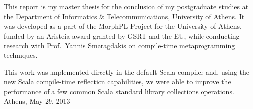 This report is my master thesis for the conclusion of my postgraduate studies at the
Department of Informatics \& Telecommunications, University of Athens.
It was developed as a part of the MorphPL Project for the University of Athens, funded by an Aristeia award granted by GSRT and the EU, while conducting research with Prof.~Yannis Smaragdakis 
on compile-time metaprogramming techniques.

This work was implemented directly in the default Scala compiler and, using the new Scala compile-time reflection capabilities, we were able to improve the performance of a few common Scala standard library collections operations.\\

\hfill{Athens,  May 29, 2013}
